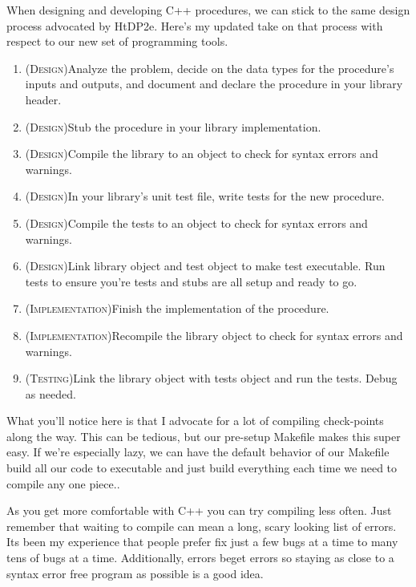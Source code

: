 \documentclass[]{tufte-handout}
\begin{document}
When designing and developing C++ procedures, we can stick to the same design process advocated by HtDP2e. Here's my updated take on that process with respect to our new set of programming tools.
\begin{enumerate}
\item (\textsc{Design})Analyze the problem, decide on the data types for the procedure's inputs and outputs, and document and declare the procedure in your library header.
\item (\textsc{Design})Stub the procedure in your library implementation. 
\item (\textsc{Design})Compile the library to an object to check for syntax errors and warnings. 
\item (\textsc{Design})In your library's unit test file, write tests for the new procedure.
\item (\textsc{Design})Compile the tests to an object to check for syntax errors and warnings.  
\item (\textsc{Design})Link library object and test object to make test executable. Run tests to ensure you're tests and stubs are all setup and ready to go.
\item (\textsc{Implementation})Finish the implementation of the procedure. 
\item (\textsc{Implementation})Recompile the library object to check for syntax errors and warnings.
\item (\textsc{Testing})Link the library object with tests object and run the tests. Debug as needed.
\end{enumerate}
What you'll notice here is that I advocate for a lot of compiling check-points along the way. This can be tedious, but our pre-setup Makefile makes this super easy. If we're especially lazy, we can have the default behavior of our Makefile build all our code to executable and just build everything each time we need to compile any one piece.. 

As you get more comfortable with C++ you can try compiling less often. Just remember that waiting to compile can mean a long, scary looking list of errors.  Its been my experience that people prefer fix just a few bugs at a time to many tens of bugs at a time.  Additionally, errors beget errors so staying as close to a syntax error free program as possible is a good idea.
\end{document}
